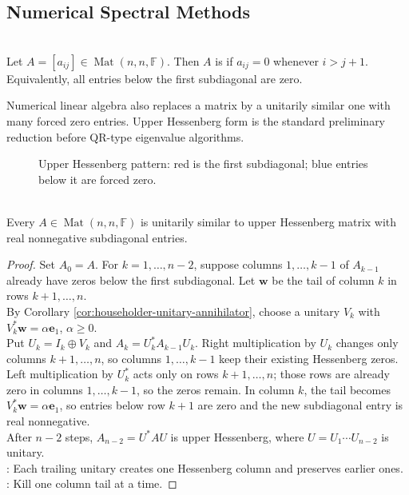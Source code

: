 \subsection{Numerical Spectral Methods}

\begin{definition} \label{def:upper-hessenberg-matrix} \\
Let $A=[a_{ij}]\in\operatorname{Mat}(n,n,\mathbb{F})$. Then $A$ is  if $a_{ij}=0$ whenever $i>j+1$.\\
Equivalently, all entries below the first subdiagonal are zero.
\end{definition}

Numerical linear algebra also replaces a matrix by a unitarily similar one with many forced zero entries. Upper Hessenberg form is the standard preliminary reduction before QR-type eigenvalue algorithms.

\begin{figure}[H]
  \centering
  
  \caption{Upper Hessenberg pattern: red is the first subdiagonal; blue entries below it are forced zero.}
  \label{fig:upper-hessenberg-pattern}
\end{figure}

\begin{theorem} \label{thm:unitary-upper-hessenberg-reduction} \\
Every $A\in\operatorname{Mat}(n,n,\mathbb{F})$ is unitarily similar to upper Hessenberg matrix with real nonnegative subdiagonal entries.
\begin{proof}
Set $A_0=A$. For $k=1,\ldots,n-2$, suppose columns $1,\ldots,k-1$ of $A_{k-1}$ already have zeros below the first subdiagonal. Let $\mathbf{w}$ be the tail of column $k$ in rows $k+1,\ldots,n$.\\
By Corollary \ref{cor:householder-unitary-annihilator}, choose a unitary $V_k$ with $V_k^*\mathbf{w}=\alpha\mathbf{e}_1$, $\alpha\geq0$.\\
Put $U_k=I_k\oplus V_k$ and $A_k=U_k^*A_{k-1}U_k$. Right multiplication by $U_k$ changes only columns $k+1,\ldots,n$, so columns $1,\ldots,k-1$ keep their existing Hessenberg zeros. Left multiplication by $U_k^*$ acts only on rows $k+1,\ldots,n$; those rows are already zero in columns $1,\ldots,k-1$, so the zeros remain. In column $k$, the tail becomes $V_k^*\mathbf{w}=\alpha\mathbf{e}_1$, so entries below row $k+1$ are zero and the new subdiagonal entry is real nonnegative.\\
After $n-2$ steps, $A_{n-2}=U^*AU$ is upper Hessenberg, where $U=U_1\cdots U_{n-2}$ is unitary.\\
: Each trailing unitary creates one Hessenberg column and preserves earlier ones.\\
: Kill one column tail at a time.
\end{proof}
\end{theorem}

